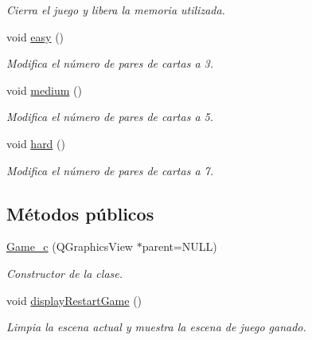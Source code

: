 \begin{DoxyCompactItemize}
\begin{DoxyCompactList}\small\item\em Cierra el juego y libera la memoria utilizada. \end{DoxyCompactList}\item 
\hypertarget{classGame__c_a99323cea61a4bdde0df2b488f4aff176}{void \hyperlink{classGame__c_a99323cea61a4bdde0df2b488f4aff176}{easy} ()}\label{classGame__c_a99323cea61a4bdde0df2b488f4aff176}

\begin{DoxyCompactList}\small\item\em Modifica el número de pares de cartas a 3. \end{DoxyCompactList}\item 
\hypertarget{classGame__c_af3b1d7d1377731e29a2480795be29ffc}{void \hyperlink{classGame__c_af3b1d7d1377731e29a2480795be29ffc}{medium} ()}\label{classGame__c_af3b1d7d1377731e29a2480795be29ffc}

\begin{DoxyCompactList}\small\item\em Modifica el número de pares de cartas a 5. \end{DoxyCompactList}\item 
\hypertarget{classGame__c_aa75657f3cad93d6fd5516490b7050eba}{void \hyperlink{classGame__c_aa75657f3cad93d6fd5516490b7050eba}{hard} ()}\label{classGame__c_aa75657f3cad93d6fd5516490b7050eba}

\begin{DoxyCompactList}\small\item\em Modifica el número de pares de cartas a 7. \end{DoxyCompactList}\end{DoxyCompactItemize}
\subsection*{Métodos públicos}
\begin{DoxyCompactItemize}
\item 
\hyperlink{classGame__c_a8d6870df89ef4538c92e03a9343770c8}{Game\-\_\-c} (Q\-Graphics\-View $\ast$parent=N\-U\-L\-L)
\begin{DoxyCompactList}\small\item\em Constructor de la clase. \end{DoxyCompactList}\item 
\hypertarget{classGame__c_a67f5de98582607c4c60bca57400bc63a}{void \hyperlink{classGame__c_a67f5de98582607c4c60bca57400bc63a}{display\-Restart\-Game} ()}\label{classGame__c_a67f5de98582607c4c60bca57400bc63a}

\begin{DoxyCompactList}\small\item\em Limpia la escena actual y muestra la escena de juego ganado. \end{DoxyCompactList}\end{DoxyCompactItemize}


